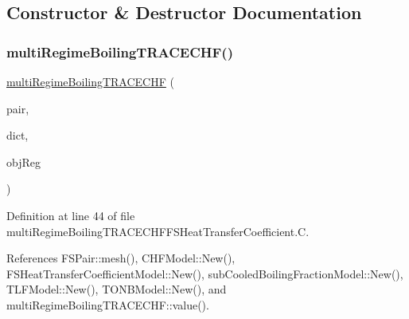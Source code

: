 \subsection{Constructor \& Destructor Documentation}
\mbox{\label{classFoam_1_1FSHeatTransferCoefficientModels_1_1multiRegimeBoilingTRACECHF_ab88c86ec12273cdb644af085f008ae54}} 
\subsubsection{\texorpdfstring{multi\+Regime\+Boiling\+T\+R\+A\+C\+E\+C\+H\+F()}{multiRegimeBoilingTRACECHF()}}
{\footnotesize\ttfamily \hyperlink{classFoam_1_1FSHeatTransferCoefficientModels_1_1multiRegimeBoilingTRACECHF}{multi\+Regime\+Boiling\+T\+R\+A\+C\+E\+C\+HF} (\begin{DoxyParamCaption}\item[{const \hyperlink{classFoam_1_1FSPair}{F\+S\+Pair} \&}]{pair,  }\item[{const dictionary \&}]{dict,  }\item[{const object\+Registry \&}]{obj\+Reg }\end{DoxyParamCaption})}



Definition at line 44 of file multi\+Regime\+Boiling\+T\+R\+A\+C\+E\+C\+H\+F\+F\+S\+Heat\+Transfer\+Coefficient.\+C.



References F\+S\+Pair\+::mesh(), C\+H\+F\+Model\+::\+New(), F\+S\+Heat\+Transfer\+Coefficient\+Model\+::\+New(), sub\+Cooled\+Boiling\+Fraction\+Model\+::\+New(), T\+L\+F\+Model\+::\+New(), T\+O\+N\+B\+Model\+::\+New(), and multi\+Regime\+Boiling\+T\+R\+A\+C\+E\+C\+H\+F\+::value().

